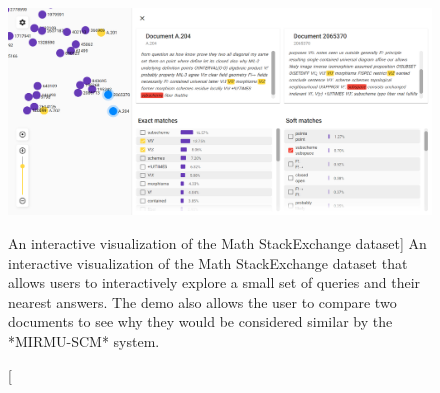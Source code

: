\begin{figure}
\includegraphics{document-maps}
\caption
  [An interactive visualization of the Math StackExchange dataset]%
  {An interactive visualization of the Math StackExchange dataset
   that allows users to interactively explore a small set of queries
   and their nearest answers. The demo also allows the user to
   compare two documents to see why they would be considered similar
   by the *MIRMU-SCM* system. \cite[Figure 3]{novotny2021ensembling}}
\label{fig:document-maps}
\end{figure}